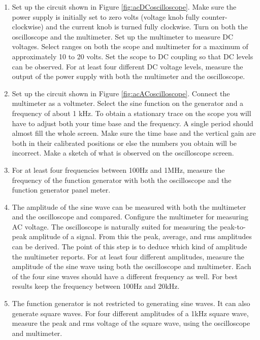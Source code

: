 \begin{enumerate}
\item Set up the circuit shown in Figure \ref{fig:acDCoscilloscope}. Make sure the power supply is initially set to zero volts (voltage knob fully counter-clockwise) and the current knob is turned fully clockwise. Turn on both the oscilloscope and the multimeter. Set up the multimeter to measure DC voltages. Select ranges on both the scope and multimeter for a maximum of approximately 10 to 20 volts. Set the scope to DC coupling so that DC levels can be observed. For at least four different DC voltage levels, measure the output of the power supply with both the multimeter and the oscilloscope.

\item Set up the circuit shown in Figure \ref{fig:acACoscilloscope}. Connect the multimeter as a voltmeter. Select the sine function on the generator and a frequency of about 1 kHz. To obtain a stationary trace on the scope you will have to adjust both your time base and the frequency. A single period should almost fill the whole screen. Make sure the time base and the vertical gain are both in their calibrated positions or else the numbers you obtain will be incorrect. Make a sketch of what is observed on the oscilloscope screen.

\item For at least four frequencies between 100Hz and 1MHz, measure the frequency of the function generator with both the oscilloscope and the function generator panel meter.

\item The amplitude of the sine wave can be measured with both the multimeter and the oscilloscope and compared. Configure the multimeter for measuring AC voltage. The oscilloscope is naturally suited for measuring the peak-to-peak amplitude of a signal. From this the peak, average, and rms amplitudes can be derived. The point of this step is to deduce which kind of amplitude the multimeter reports. For at least four different amplitudes, measure the amplitude of the sine wave using both the oscilloscope and multimeter. Each of the four sine waves should have a different frequency as well. For best results keep the frequency between 100Hz and 20kHz. 

\item The function generator is not restricted to generating sine waves. It can also generate square waves. For four different amplitudes of a 1kHz square wave, measure the peak and rms voltage of the square wave, using the oscilloscope and multimeter.


\end{enumerate}
